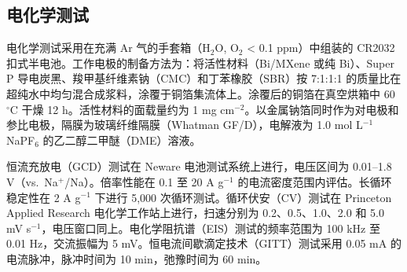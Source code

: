 \subsection{电化学测试}

电化学测试采用在充满 Ar 气的手套箱（H$_{2}$O, O$_{2}$ < 0.1 ppm）中组装的 CR2032 扣式半电池。工作电极的制备方法为：将活性材料（Bi/MXene 或纯 Bi）、Super P 导电炭黑、羧甲基纤维素钠（CMC）和丁苯橡胶（SBR）按 7:1:1:1 的质量比在超纯水中均匀混合成浆料，涂覆于铜箔集流体上。涂覆后的铜箔在真空烘箱中 60 $^{\circ}$C 干燥 12 h。活性材料的面载量约为 1 mg cm$^{-2}$。以金属钠箔同时作为对电极和参比电极，隔膜为玻璃纤维隔膜（Whatman GF/D），电解液为 1.0 mol L$^{-1}$ NaPF$_{6}$ 的乙二醇二甲醚（DME）溶液。

恒流充放电（GCD）测试在 Neware 电池测试系统上进行，电压区间为 0.01--1.8 V（vs.\ Na$^{+}$/Na）。倍率性能在 0.1 至 20 A g$^{-1}$ 的电流密度范围内评估。长循环稳定性在 2 A g$^{-1}$ 下进行 5,000 次循环测试。循环伏安（CV）测试在 Princeton Applied Research 电化学工作站上进行，扫速分别为 0.2、0.5、1.0、2.0 和 5.0 mV s$^{-1}$，电压窗口同上。电化学阻抗谱（EIS）测试的频率范围为 100 kHz 至 0.01 Hz，交流振幅为 5 mV。恒电流间歇滴定技术（GITT）测试采用 0.05 mA 的电流脉冲，脉冲时间为 10 min，弛豫时间为 60 min。
